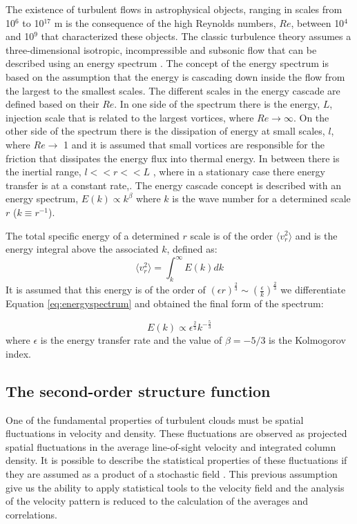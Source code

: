 \documentclass[fleqn,usenatbib, useAMS, a4paper]{mnras}
\begin{document}
The existence of turbulent flows in astrophysical objects, ranging in scales from 10$^{6}$ to 10$^{17}$ m \citep{2010ApJ...710..853C} is the consequence of the high Reynolds numbers, $Re$, between 10$^{4}$ and 10$^{9}$ \citep{1949ApJ...110..329C,lagrois2011} that characterized these objects.
The classic turbulence theory assumes a three-dimensional isotropic, incompressible and subsonic flow that can be described using an energy spectrum \citep{kolm1}.
The concept of the energy spectrum is based on the assumption that the energy is cascading down inside the flow from the largest to the smallest scales.
The different scales in the energy cascade are defined based on their $Re$.
In one side of the spectrum there is the energy, \(L\), injection scale that is related to the largest vortices, where $ Re \rightarrow \infty$.
On the other side of the spectrum there is the dissipation of energy at small scales, \(l\), where $Re \rightarrow$ 1 and it is assumed that small vortices are responsible for the friction that dissipates the energy flux into thermal energy.
In between there is the inertial range, \(l  << r << L\) , where in a stationary case there energy transfer is at a constant rate,.
The energy cascade concept is described with an energy spectrum, $E(k) \propto k^{\beta}$ where $k$ is the wave number for a determined scale $r$ ($k \equiv r^{-1}$).

The total specific energy of a determined $r$ scale is of the order $\langle v_{r}^{2} \rangle$ and is the energy integral above the associated $k$, defined as:
\begin{equation}\label{eq:energyspectrum}
 \langle v_{r}^{2} \rangle = \int_{k}^{\infty} E(k)dk
\end{equation}
%
It is assumed that this energy is of the order of $(\epsilon r)^{\frac{2}{3}} \sim (\frac{\epsilon}{k})^{\frac{2}{3}}$ we differentiate Equation \ref{eq:energyspectrum} and obtained the final form of the spectrum:

\begin{equation}\label{eq:kolm}
E(k) \propto \epsilon^\frac{2}{3} k^{-\frac{5}{3}}
\end{equation}
%
where \(\epsilon\) is the energy transfer rate and the value of $\beta = -5 / 3$ is the Kolmogorov index.

\subsection{The second-order structure function}
\label{sec:second-order-struct}
One of the fundamental properties of turbulent clouds must be spatial fluctuations in velocity and density.
These fluctuations are observed as projected spatial fluctuations in the average line-of-sight velocity and integrated column density.
It is possible to describe the statistical properties of these fluctuations if they are assumed as a product of a stochastic field \citep{1984ApJ...277..556S}. 
This previous assumption give us the ability to apply statistical tools to the velocity field and the analysis of the velocity pattern is reduced to the calculation of the averages and correlations.
\end{document}
